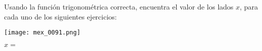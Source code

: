 \documentclass[12pt,addpoints]{evalua}
\begin{document}
\begin{questions}



    \question[5] Usando la función trigonométrica correcta, encuentra el valor de los lados $x$, para cada uno de los siguientes ejercicios:

    \begin{multicols}{2}

        \texttt{[image: mex\_0091.png]}

        \begin{solutionbox}{7cm}
            $x=$\fillin[$37.08$][0cm]
        \end{solutionbox}



\end{multicols}
\end{questions}
\end{document}
